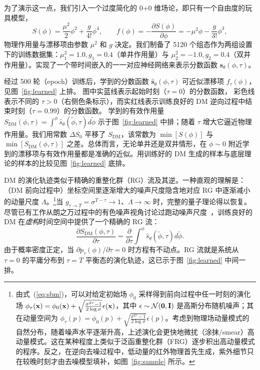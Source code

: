 为了演示这一点，我们引入一个过度简化的 0+0 维场论，即只有一个自由度的玩具模型，
\begin{equation}
    S(\phi) = \frac{\mu^2}{2}\phi^2 + \frac{g}{4!}\phi^4,
    \qquad
    f(\phi) = -\frac{\partial S(\phi)}{\partial\phi} = - \mu^2 \phi - \frac{g}{3!}\phi^3,
\end{equation}
物理作用量与漂移项由参数 $\mu^2$ 和 $g$ 决定。我们制备了 5120 个组态作为两组设置下的训练数据集：$\mu_1^2 = 1.0, g_1 = 0.4$（单井作用量）与 $\mu_2^2 = -1.0, g_2 = 0.4$（双井作用量）。实现了一个带时间嵌入的一一对应神经网络来表示分数函数 $\mathbf{s}_\theta(\phi,\tau)$。


经过 500 轮（epoch）训练后，学到的分数函数 $\hat{\mathbf{s}}_\theta(\phi,\tau)$ 可近似漂移项 $f_\tau(\phi)$，见图~\ref{fig:learned} 上排。
图中实蓝线表示起始时刻（$\tau = 0$）的分数函数，
彩色线表示不同的 $\tau > 0$（右侧色条标示），而实红线表示训练良好的 DM 逆向过程中结束时刻（$\tau = 0.99$）的分数函数。
学到的有效作用量 $S_\text{DM}(\phi,\tau) = \int^{\phi}\hat{s}_\theta(\tilde{\phi},\tau) d\tilde{\phi} $ 示于图~\ref{fig:learned} 中排；随着 $\tau$ 增大它逼近物理作用量。我们用常数 $\Delta S_0$ 平移了 $S_\text{DM}$，该常数为 $\min[S(\phi)]$ 与 $\min[S_\text{DM}(\phi,\tau)]$ 之差。总体而言，无论单井还是双井情形，在 $\phi\sim 0$ 附近学到的漂移项与有效作用量都是准确的近似。用训练好的 DM 生成的样本与底层理论的样本的比较见图~\ref{fig:learned} 底排。

DM 的演化轨迹类似于精确的重整化群（RG）流及其逆。一种直观的理解是：（DM 前向过程中）坐标空间里逐渐增大的噪声尺度隐含地对应 RG 中逐渐减小的动量尺度 $\Lambda$。\footnote{由式~(\ref{eq:sbm})，可以对给定初始场 $\phi_0$ 采样得到前向过程中任一时刻的演化场 $\phi_{\tau}({\bf x})=\phi_{0}({\bf x}) + \sqrt{\frac{\sigma^{2\tau}-1}{2\log\sigma}}\epsilon({\bf x})$，其中 $\epsilon\sim\mathcal{N}({\bf 0},{\bf I})$ 是高斯分布随机噪声；其在动量空间为 $\phi_{\tau}(p)=\phi_{0}(p)+\sqrt{\frac{\sigma^{2\tau}-1}{2\log\sigma}}\epsilon(p)$。考虑到物理场动量模式的自然分布，随着噪声水平逐渐升高，上述演化会更快地微扰（涂抹/smear）高动量模式。这在某种程度上类似于泛函重整化群（FRG）逐步积出高动量模式的程序。反之，在逆向去噪过程中，低动量的红外物理首先生成，紫外细节只在较晚时刻才由去噪模型填补，如图~\ref{fig:sample} 所示。}当 $g_{\tau \rightarrow T} = \sigma^{T-\tau} \rightarrow 1$、$\Lambda \rightarrow \infty$ 时，完整的量子理论得以恢复。尽管已有工作从朗之万过程中的有色噪声视角讨论过跑动噪声尺度~\cite{Bern:1986xc,Pawlowski:2017rhn}，训练良好的 DM 在\textit{虚构}时间空间中提供了一个精确的 RG 流：
\begin{equation}
    \frac{\partial S_\text{DM}(\phi,\tau)}{\partial \tau} = \frac{\partial}{\partial \tau} \int^{\phi}\hat{s}_\theta(\tilde{\phi},\tau) d\tilde{\phi}.
\end{equation}
由于概率密度正定，当 $\partial p_\tau(\phi)/\partial\tau = 0$ 时方程有不动点。RG 流就是系统从 $\tau = 0$ 的平庸分布到 $\tau = T$ 平衡态的演化轨迹，这已示于图~\ref{fig:learned} 中间一排。
